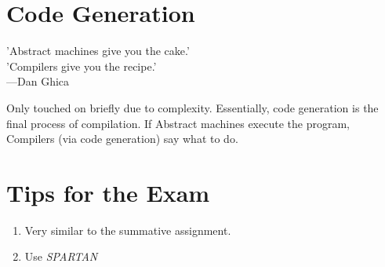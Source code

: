 \documentclass{article}
\begin{document}
\section{Code Generation}

\begin{displayquote}
   'Abstract machines give you the cake.'\\
   'Compilers give you the recipe.'\\
   ---Dan Ghica
\end{displayquote}

Only touched on briefly due to complexity. Essentially, code generation is the final process of compilation. If Abstract machines execute the program, Compilers (via code generation) say what to do. 

\section{Tips for the Exam}
\begin{enumerate}
    \item Very similar to the summative assignment.
    \item Use \textit{SPARTAN}
\end{enumerate}
\end{document}
